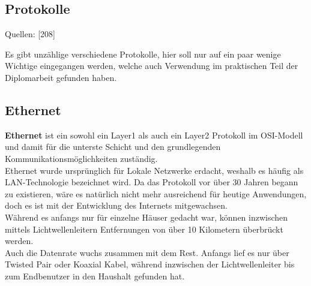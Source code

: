 \documentclass[12pt,a4paper]{report}
\begin{document}
\begin{onehalfspace}
\section{Protokolle}
\begin{flushright}
\begin{tiny}
Quellen: [208]
\end{tiny}
\end{flushright}
Es gibt unzählige verschiedene Protokolle, hier soll nur auf ein paar wenige Wichtige eingegangen werden, welche auch Verwendung im praktischen Teil der Diplomarbeit gefunden haben.
\subsection{Ethernet}\label{ssec:eth}
\textbf{Ethernet} ist ein sowohl ein Layer1 als auch ein Layer2 Protokoll im OSI-Modell und damit für die unterste Schicht und den grundlegenden Kommunikationsmöglichkeiten zuständig.\\

Ethernet wurde ursprünglich für Lokale Netzwerke erdacht, weshalb es häufig als LAN-Technologie bezeichnet wird. Da das Protokoll vor über 30 Jahren begann zu existieren, wäre es natürlich nicht mehr ausreichend für heutige Anwendungen, doch es ist mit der Entwicklung des Internets mitgewachsen.\\
Während es anfangs nur für einzelne Häuser gedacht war, können inzwischen mittels Lichtwellenleitern Entfernungen von über 10 Kilometern überbrückt werden.\\

Auch die Datenrate wuchs zusammen mit dem Rest. Anfangs lief es nur über Twisted Pair oder Koaxial Kabel, während inzwischen der Lichtwellenleiter bis zum Endbenutzer in den Haushalt gefunden hat.\\


\end{onehalfspace}
\end{document}
